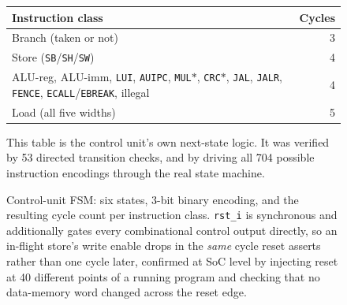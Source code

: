 \documentclass[11pt,a4paper]{article}
\newcommand{\hdr}[1]{\textbf{#1}}
\newcommand{\hrow}{\rowcolor{rvbltint}}
\begin{document}
\begin{figure}[htbp]
\begin{minipage}{0.615\linewidth}
\end{minipage}\hfill
\begin{minipage}{0.37\linewidth}
\scriptsize
\begin{tabularx}{\linewidth}{Xr}
\toprule
\hrow \hdr{Instruction class} & \hdr{Cycles} \\
\midrule
Branch (taken or not)                       & 3 \\
Store (\texttt{SB}/\texttt{SH}/\texttt{SW}) & 4 \\
ALU-reg, ALU-imm, \texttt{LUI},
\texttt{AUIPC}, \texttt{MUL}$*$,
\texttt{CRC}$*$, \texttt{JAL},
\texttt{JALR}, \texttt{FENCE},
\texttt{ECALL}/\texttt{EBREAK}, illegal     & 4 \\
Load (all five widths)                      & 5 \\
\bottomrule
\end{tabularx}
\vspace{3pt}
{\tiny This table is the control unit's own next-state logic. It was verified by 53
directed transition checks, and by driving all 704 possible instruction encodings through
the real state machine.}
\end{minipage}
\caption{Control-unit FSM: six states, 3-bit binary encoding, and the resulting cycle count
per instruction class. \texttt{rst\_i} is synchronous and additionally gates every
combinational control output directly, so an in-flight store's write enable drops in the
\emph{same} cycle reset asserts rather than one cycle later, confirmed at SoC level by
injecting reset at 40 different points of a running program and checking that no data-memory
word changed across the reset edge.}
\label{fig:fsm}
\end{figure}
\end{document}
